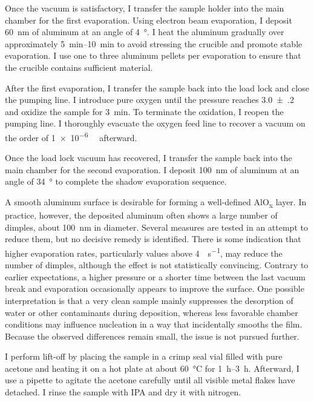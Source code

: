         Once the vacuum is satisfactory, I transfer the sample holder into the main chamber for the first evaporation. Using electron beam evaporation, I deposit \qty{60}{\nano\meter} of aluminum at an angle of \qty{4}{\degree}. I heat the aluminum gradually over approximately \qtyrange{5}{10}{\minute} to avoid stressing the crucible and promote stable evaporation. I use one to three aluminum pellets per evaporation to ensure that the crucible contains sufficient material.

        After the first evaporation, I transfer the sample back into the load lock and close the pumping line. I introduce pure oxygen until the pressure reaches \qty{3.0(2)}{\milli\barunit} and oxidize the sample for \qty{3}{\minute}. To terminate the oxidation, I reopen the pumping line. I thoroughly evacuate the oxygen feed line to recover a vacuum on the order of \qty{1e-6}{\milli\barunit} afterward.

        Once the load lock vacuum has recovered, I transfer the sample back into the main chamber for the second evaporation. I deposit \qty{100}{\nano\meter} of aluminum at an angle of \qty{34}{\degree} to complete the shadow evaporation sequence.

        A smooth aluminum surface is desirable for forming a well-defined AlO\textsubscript{x} layer. In practice, however, the deposited aluminum often shows a large number of dimples, about \qty{100}{nm} in diameter. Several measures are tested in an attempt to reduce them, but no decisive remedy is identified. There is some indication that higher evaporation rates, particularly values above \qty{4}{\angstromunit\per\second}, may reduce the number of dimples, although the effect is not statistically convincing. Contrary to earlier expectations, a higher pressure or a shorter time between the last vacuum break and evaporation occasionally appears to improve the surface. One possible interpretation is that a very clean sample mainly suppresses the desorption of water or other contaminants during deposition, whereas less favorable chamber conditions may influence nucleation in a way that incidentally smooths the film. Because the observed differences remain small, the issue is not pursued further.

        I perform lift-off by placing the sample in a crimp seal vial filled with pure acetone and heating it on a hot plate at about \qty{60}{\degreeCelsius} for \qtyrange{1}{3}{\hour}. Afterward, I use a pipette to agitate the acetone carefully until all visible metal flakes have detached. I rinse the sample with IPA and dry it with nitrogen.

